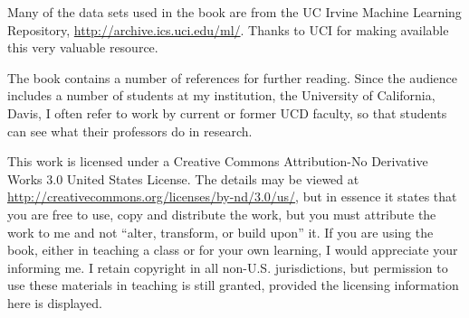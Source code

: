 Many of the data sets used in the book are from the UC Irvine Machine
Learning Repository, \url{http://archive.ics.uci.edu/ml/}.  Thanks to
UCI for making available this very valuable resource.

The book contains a number of references for further reading.  Since the
audience includes a number of students at my institution, the University
of California, Davis, I often refer to work by current or former UCD
faculty, so that students can see what their professors do in research.

This work is licensed under a Creative Commons Attribution-No Derivative
Works 3.0 United States License.  The details may be viewed at
\url{http://creativecommons.org/licenses/by-nd/3.0/us/}, but in essence
it states that you are free to use, copy and distribute the work, but
you must attribute the work to me and not ``alter, transform, or build
upon'' it.  If you are using the book, either in teaching a class or for
your own learning, I would appreciate your informing me.  I retain
copyright in all non-U.S. jurisdictions, but permission to use these
materials in teaching is still granted, provided the licensing
information here is displayed.  

